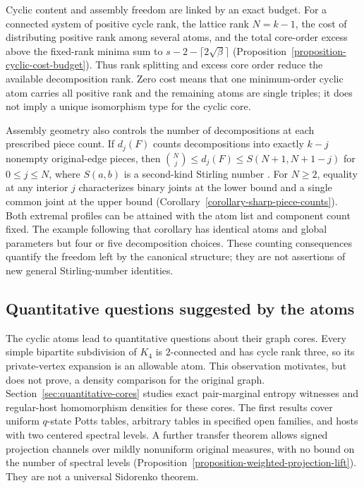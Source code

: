 \documentclass[a4paper,11pt,reqno]{amsart}
\theoremstyle{plain}
\theoremstyle{definition}
\theoremstyle{remark}
\begin{document}
Cyclic content and assembly freedom are linked by an exact budget.  For a
connected system of positive cycle rank, the lattice rank \(N=k-1\), the
cost of distributing positive rank among several atoms, and the total
core-order excess above the fixed-rank minima sum to
\(s-2-\lceil2\sqrt{\beta}\rceil\)
(Proposition~\ref{proposition-cyclic-cost-budget}).  Thus rank splitting
and excess core order reduce the available decomposition rank.  Zero cost
means that one minimum-order cyclic atom carries all positive rank and
the remaining atoms are single triples; it does not imply a unique
isomorphism type for the cyclic core.

Assembly geometry also controls the number of decompositions at each
prescribed piece count.  If \(d_j(F)\) counts decompositions into exactly
\(k-j\) nonempty original-edge pieces, then
\(\binom Nj\le d_j(F)\le S(N+1,N+1-j)\) for \(0\le j\le N\), where
\(S(a,b)\) is a second-kind Stirling number \citep{comtet1974}.
For \(N\ge2\), equality at any interior \(j\) characterizes binary joints
at the lower bound and a single common joint at the upper bound
(Corollary~\ref{corollary-sharp-piece-counts}).  Both extremal profiles can
be attained with the atom list and component count fixed.  The example
following that corollary has identical atoms and global parameters but
four or five decomposition choices.  These counting consequences quantify
the freedom left by the canonical structure; they are not assertions of
new general Stirling-number identities.

\subsection*{Quantitative questions suggested by the atoms}
The cyclic atoms lead to quantitative questions about their graph cores.
Every simple bipartite subdivision of $K_4$ is
$2$-connected and has cycle rank three, so its private-vertex expansion is
an allowable atom.  This observation motivates, but does not prove, a density
comparison for the original graph.  Section~\ref{sec:quantitative-cores}
studies exact pair-marginal entropy witnesses and regular-host homomorphism
densities for these cores.  The first results cover uniform $q$-state Potts
tables, arbitrary tables in specified open families, and hosts with two
centered spectral levels.  A further transfer theorem allows signed
projection channels over mildly nonuniform original measures, with no
bound on the number of spectral levels
(Proposition~\ref{proposition-weighted-projection-lift}).
They are not a universal Sidorenko theorem.
\end{document}

